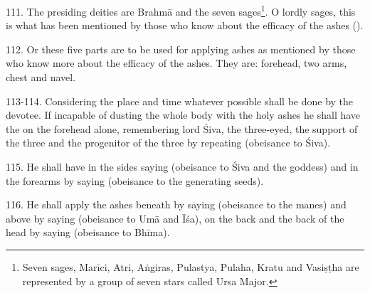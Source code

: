 111. The presiding deities are Brahmā and the seven sages\footnote{Seven sages,
\viz Marīci, Atri, Aṅgiras, Pulastya, Pulaha, Kratu and Vasiṣṭha are represented
by a group of seven stars called Ursa Major.}. O lordly sages, this is what has
been mentioned by those who know about the efficacy of the ashes ().

112. Or these five parts are to be used for applying ashes as mentioned by those
who know more about the efficacy of the ashes. They are: forehead, two arms,
chest and navel.

113-114. Considering the place and time whatever possible shall be done by
the devotee. If incapable of dusting the whole body with the holy ashes he shall
have the  on the forehead alone, remembering lord Śiva,
the three-eyed, the support of the three  and the progenitor of
the three  by repeating  (obeisance to Śiva).

115. He shall have  in the sides saying 
(obeisance to Śiva and the goddess) and in the forearms by saying  (obeisance to the generating seeds).

116. He shall apply the ashes beneath by saying  (obeisance
to the manes) and above by saying  (obeisance to Umā and
Īśa), on the back and the back of the head by saying 
(obeisance to Bhīma).
